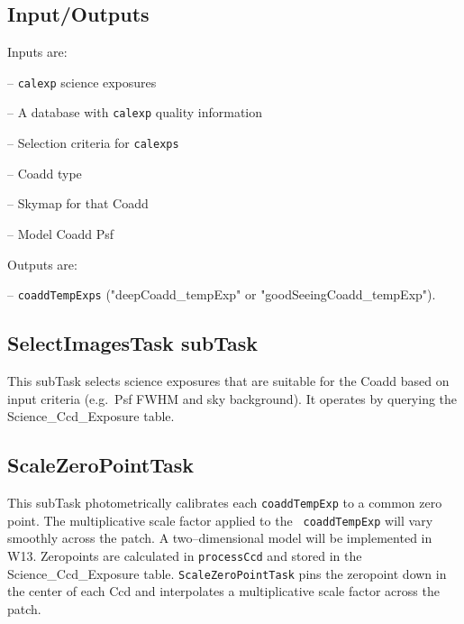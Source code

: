 \documentclass[prd, nofootinbib, floatfix, 11pt,tightenlines,times]{article}
\begin{document}
\subsection{Input/Outputs}

Inputs are:

-- {\tt calexp} science exposures 

-- A database with {\tt calexp} quality information 

-- Selection criteria for {\tt calexps}

-- Coadd type 

-- Skymap for that Coadd

-- Model Coadd Psf 

Outputs are:

-- {\tt coaddTempExps} ("deepCoadd\_tempExp" or "goodSeeingCoadd\_tempExp").

\subsection{SelectImagesTask subTask} 

This subTask selects science exposures that are suitable for the Coadd
based on input criteria (e.g.\ Psf FWHM and sky background). It operates by
querying the Science\_Ccd\_Exposure table.

\subsection{ScaleZeroPointTask} 

This subTask photometrically calibrates each {\tt coaddTempExp} to a
common zero point.  The multiplicative scale factor applied to the {\tt
  coaddTempExp} will vary smoothly across the patch. A two--dimensional
model will be implemented in W13.  Zeropoints are 
calculated in {\tt processCcd} and stored in the
Science\_Ccd\_Exposure table. {\tt ScaleZeroPointTask} pins the
zeropoint down in the center of each Ccd and interpolates a
multiplicative scale factor across the patch.

\end{document}
